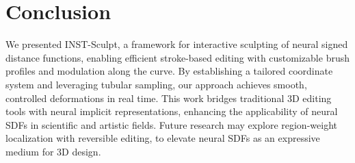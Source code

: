 \section{Conclusion}
We presented INST-Sculpt, a framework for interactive sculpting of neural signed distance functions, enabling efficient stroke-based editing with customizable brush profiles and modulation along the curve. By establishing a tailored coordinate system and leveraging tubular sampling, our approach achieves smooth, controlled deformations in real time. This work bridges traditional 3D editing tools with neural implicit representations, enhancing the applicability of neural SDFs in scientific and artistic fields. Future research may explore region-weight localization with reversible editing, to elevate neural SDFs as an expressive medium for 3D design.